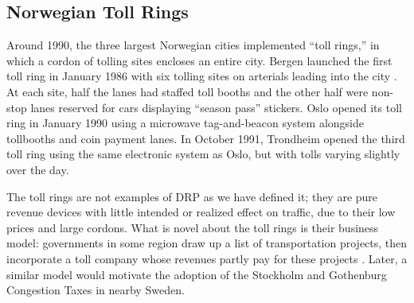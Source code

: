 \subsection{Norwegian Toll Rings}

Around 1990, the three largest Norwegian cities implemented ``toll rings,'' in which a cordon of tolling sites encloses an entire city. Bergen launched the first toll ring in January 1986 with six tolling sites on arterials leading into the city \citep{Ieromonachou2006,Ramjerdi2004,Gomez-Ibanez1994}. At each site, half the lanes had staffed toll booths and the other half were non-stop lanes reserved for cars displaying ``season pass'' stickers. Oslo opened its toll ring in January 1990 using a microwave tag-and-beacon system alongside tollbooths and coin payment lanes. In October 1991, Trondheim opened the third toll ring using the same electronic system as Oslo, but with tolls varying slightly over the day.

The toll rings are not examples of DRP as we have defined it; they are pure revenue devices with little intended or realized effect on traffic, due to their low prices and large cordons. What is novel about the toll rings is their business model:  governments in some region draw up a list of transportation projects, then incorporate a toll company whose revenues partly pay for these projects \citep{Ieromonachou2006}. Later, a similar model would motivate the adoption of the Stockholm and Gothenburg Congestion Taxes in nearby Sweden.
